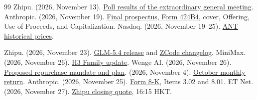 \documentclass[11pt]{article}
\begin{document}
\begin{thebibliography}{99}
 Zhipu. (2026, November 13). \href{https://www1.hkexnews.hk/listedco/listconews/sehk/2026/1113/2026111301466.pdf}{Poll results of the extraordinary general meeting}.
 Anthropic. (2026, November 19). \href{https://www.sec.gov/Archives/edgar/data/2130357/000162828026074944/anthropicpbc-424b4.htm}{Final prospectus, Form 424B4}, cover, Offering, Use of Proceeds, and Capitalization.
 Nasdaq. (2026, November 19--25). \href{https://www.nasdaq.com/market-activity/stocks/ant/historical}{ANT historical prices}.


 Zhipu. (2026, November 23). \href{https://z.ai/blog/glm-5.4?lang=en}{GLM-5.4 release} and \href{https://zcode.z.ai/en/changelog}{ZCode changelog}. MiniMax. (2026, November 26). \href{https://www.minimax.io/blog/minimax-h3-family}{H3 Family update}.
 Wenge AI. (2026, November 26). \href{https://www1.hkexnews.hk/listedco/listconews/sehk/2026/1126/2026112600905.pdf}{Proposed repurchase mandate and plan}. (2026, November 4). \href{https://www1.hkexnews.hk/listedco/listconews/sehk/2026/1104/2026110400528.pdf}{October monthly return}.
 Anthropic. (2026, November 25). \href{https://www.sec.gov/Archives/edgar/data/2130357/000162828026075973/ant-20261119.htm}{Form 8-K}, Items 3.02 and 8.01.
 ET Net. (2026, November 27). \href{https://content.etnet.com.hk/content/cpyrevamp/sc/stock_quote.php?code=02513}{Zhipu closing quote}, 16:15 HKT.
\end{thebibliography}
\end{document}
